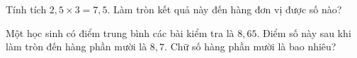 \begin{ex}
  Tính tích $2{,}5 \times 3 = 7{,}5$. Làm tròn kết quả này đến hàng đơn vị được số nào?
\end{ex}

\begin{ex}
  Một học sinh có điểm trung bình các bài kiểm tra là $8{,}65$. Điểm số này sau khi làm tròn đến hàng phần mười là $8{,}7$. Chữ số hàng phần mười là bao nhiêu?
\end{ex}
